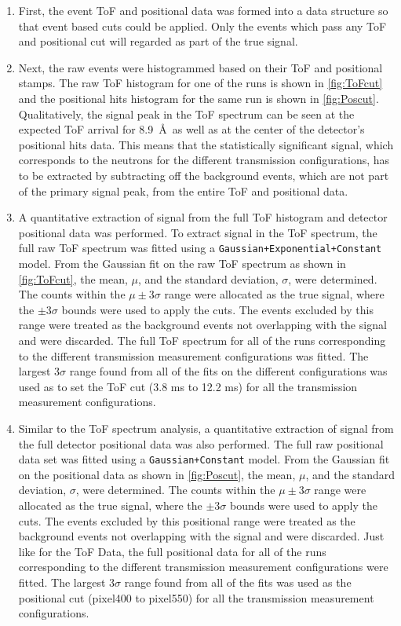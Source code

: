 \begin{enumerate}
    \item First, the event ToF and positional data was formed into a data structure so that event based cuts could be applied. Only the events which pass any ToF and positional cut will regarded as part of the true signal.
    \item Next, the raw events were histogrammed based on their ToF and positional stamps. The raw ToF histogram for one of the runs is shown in \cref{fig:ToFcut} and the positional hits histogram for the same run is shown in \cref{fig:Poscut}. Qualitatively, the signal peak in the ToF spectrum can be seen at the expected ToF arrival for 8.9~\AA\ as well as at the center of the detector's positional hits data. This means that the statistically significant signal, which corresponds to the neutrons for the different transmission configurations, has to be extracted by subtracting off the background events, which are not part of the primary signal peak, from the entire ToF and positional data. 
    \item A quantitative extraction of signal from the full ToF histogram and detector positional data was performed. To extract signal in the ToF spectrum, the full raw ToF spectrum was fitted using a \texttt{Gaussian+Exponential+Constant} model. From the Gaussian fit on the raw ToF spectrum as shown in \cref{fig:ToFcut}, the mean, $\mu$, and the standard deviation, $\sigma$, were determined. The counts within the $\mu \pm 3\sigma$ range were allocated as the true signal, where the $\pm 3\sigma$ bounds were used to apply the cuts. The events excluded by this range were treated as the background events not overlapping with the signal and were discarded. The full ToF spectrum for all of the runs corresponding to the different transmission measurement configurations was fitted. The largest $3\sigma$ range found from all of the fits on the different configurations was used as to set the ToF cut (3.8 ms to 12.2 ms) for all the transmission measurement configurations.
    \item Similar to the ToF spectrum analysis, a quantitative extraction of signal from the full detector positional data was also performed. The full raw positional data set was fitted using a \texttt{Gaussian+Constant} model. From the Gaussian fit on the positional data as shown in \cref{fig:Poscut}, the mean, $\mu$, and the standard deviation, $\sigma$, were determined. The counts within the $\mu \pm 3\sigma$ range were allocated as the true signal, where the $\pm 3\sigma$ bounds were used to apply the cuts. The events excluded by this positional range were treated as the background events not overlapping with the signal and were discarded. Just like for the ToF Data, the full positional data for all of the runs corresponding to the different transmission measurement configurations were fitted. The largest $3\sigma$ range found from all of the fits was used as the positional cut (pixel400 to pixel550) for all the transmission measurement configurations.


\end{enumerate}
